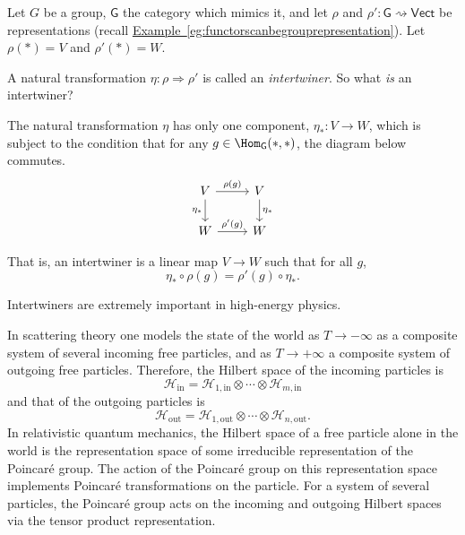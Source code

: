 \documentclass[notes.tex]{subfiles}
\begin{document}
\begin{example}
  \label{eg:intertwinersarenaturaltransformations}
  Let $G$ be a group, $\mathsf{G}$ the category which mimics it, and let $\rho$ and $\rho'\colon \mathsf{G} \rightsquigarrow \mathsf{Vect}$ be representations (recall \hyperref[eg:functorscanbegrouprepresentation]{Example~\ref*{eg:functorscanbegrouprepresentation}}). Let $\rho(*) = V$ and $\rho'(*) = W$.

  A natural transformation $\eta\colon \rho \Rightarrow \rho'$ is called an \emph{intertwiner}. So what \emph{is} an intertwiner?

  The natural transformation $\eta$ has only one component, $\eta_{*}\colon V \to W$, which is subject to the condition that for any $g \in \Hom_{\mathsf{G}}(*,*)$, the diagram below commutes.
  \begin{equation*}
    \begin{tikzcd}
      V
      \arrow[r, "\rho(g)"]
      \arrow[d, swap, "\eta_{*}"]
      & V
      \arrow[d, "\eta_{*}"]
      \\
      W
      \arrow[r, "\rho'(g)"]
      & W
    \end{tikzcd}
  \end{equation*}

  That is, an intertwiner is a linear map $V \to W$ such that for all $g$,
  \begin{equation*}
    \eta_{*} \circ \rho(g) = \rho'(g) \circ \eta_{*}.
  \end{equation*}

  Intertwiners are extremely important in high-energy physics. 
  
  In scattering theory one models the state of the world as $T \to - \infty$ as a composite system of several incoming free particles, and as $T \to +\infty$ a composite system of outgoing free particles. Therefore, the Hilbert space of the incoming particles is
  \begin{equation*}
    \mathscr{H}_{\mathrm{in}} = \mathscr{H}_{1, \mathrm{in}} \otimes \cdots \otimes \mathscr{H}_{m, \mathrm{in}}
  \end{equation*}
  and that of the outgoing particles is
  \begin{equation*}
    \mathscr{H}_{\mathrm{out}} = \mathscr{H}_{1, \mathrm{out}} \otimes \cdots \otimes \mathscr{H}_{n, \mathrm{out}}.
  \end{equation*}
  In relativistic quantum mechanics, the Hilbert space of a free particle alone in the world is the representation space of some irreducible representation of the Poincaré group. The action of the Poincaré group on this representation space implements Poincaré transformations on the particle. For a system of several particles, the Poincaré group acts on the incoming and outgoing Hilbert spaces via the tensor product representation.


\end{example}
\end{document}
